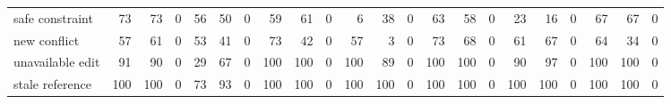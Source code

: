 \begin{tabular}{lrrrrrrrrrrrrrrrrrrrrr}
safe constraint & \cellcolor[gray]{0.74}73 & \cellcolor[gray]{0.74}73 & \cellcolor[gray]{1.00}0 & \cellcolor[gray]{0.81}56 & \cellcolor[gray]{0.82}50 & \cellcolor[gray]{1.00}0 & \cellcolor[gray]{0.79}59 & \cellcolor[gray]{0.79}61 & \cellcolor[gray]{1.00}0 & \cellcolor[gray]{0.98}6 & \cellcolor[gray]{0.87}38 & \cellcolor[gray]{1.00}0 & \cellcolor[gray]{0.78}63 & \cellcolor[gray]{0.80}58 & \cellcolor[gray]{1.00}0 & \cellcolor[gray]{0.92}23 & \cellcolor[gray]{0.95}16 & \cellcolor[gray]{1.00}0 & \cellcolor[gray]{0.77}67 & \cellcolor[gray]{0.77}67 & \cellcolor[gray]{1.00}0 \\
new conflict & \cellcolor[gray]{0.80}57 & \cellcolor[gray]{0.79}61 & \cellcolor[gray]{1.00}0 & \cellcolor[gray]{0.81}53 & \cellcolor[gray]{0.86}41 & \cellcolor[gray]{1.00}0 & \cellcolor[gray]{0.74}73 & \cellcolor[gray]{0.85}42 & \cellcolor[gray]{1.00}0 & \cellcolor[gray]{0.80}57 & \cellcolor[gray]{0.99}3 & \cellcolor[gray]{1.00}0 & \cellcolor[gray]{0.74}73 & \cellcolor[gray]{0.76}68 & \cellcolor[gray]{1.00}0 & \cellcolor[gray]{0.79}61 & \cellcolor[gray]{0.77}67 & \cellcolor[gray]{1.00}0 & \cellcolor[gray]{0.78}64 & \cellcolor[gray]{0.88}34 & \cellcolor[gray]{1.00}0 \\
unavailable edit & \cellcolor[gray]{0.68}91 & \cellcolor[gray]{0.69}90 & \cellcolor[gray]{1.00}0 & \cellcolor[gray]{0.90}29 & \cellcolor[gray]{0.77}67 & \cellcolor[gray]{1.00}0 & \cellcolor[gray]{0.65}100 & \cellcolor[gray]{0.65}100 & \cellcolor[gray]{1.00}0 & \cellcolor[gray]{0.65}100 & \cellcolor[gray]{0.69}89 & \cellcolor[gray]{1.00}0 & \cellcolor[gray]{0.65}100 & \cellcolor[gray]{0.65}100 & \cellcolor[gray]{1.00}0 & \cellcolor[gray]{0.69}90 & \cellcolor[gray]{0.66}97 & \cellcolor[gray]{1.00}0 & \cellcolor[gray]{0.65}100 & \cellcolor[gray]{0.65}100 & \cellcolor[gray]{1.00}0 \\
stale reference & \cellcolor[gray]{0.65}100 & \cellcolor[gray]{0.65}100 & \cellcolor[gray]{1.00}0 & \cellcolor[gray]{0.74}73 & \cellcolor[gray]{0.67}93 & \cellcolor[gray]{1.00}0 & \cellcolor[gray]{0.65}100 & \cellcolor[gray]{0.65}100 & \cellcolor[gray]{1.00}0 & \cellcolor[gray]{0.65}100 & \cellcolor[gray]{0.65}100 & \cellcolor[gray]{1.00}0 & \cellcolor[gray]{0.65}100 & \cellcolor[gray]{0.65}100 & \cellcolor[gray]{1.00}0 & \cellcolor[gray]{0.65}100 & \cellcolor[gray]{0.65}100 & \cellcolor[gray]{1.00}0 & \cellcolor[gray]{0.65}100 & \cellcolor[gray]{0.65}100 & \cellcolor[gray]{1.00}0 \\
\bottomrule
\end{tabular}
